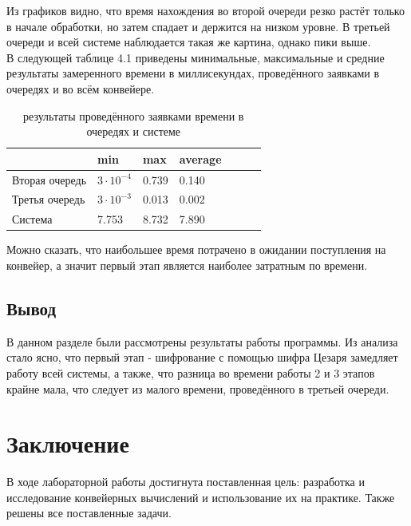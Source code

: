 \documentclass[12pt,a4paper]{report}
\begin{document}
Из графиков видно, что время нахождения во второй очереди резко растёт только в начале обработки, но затем 
спадает и держится на низком уровне.
В третьей очереди и всей системе наблюдается такая же картина, однако пики выше.\\

\newpage
В следующей таблице 4.1 приведены минимальные, максимальные и средние результаты замеренного времени в миллисекундах, 
проведённого заявками в очередях и во всём конвейере.

\begin{table}[h!]
	\caption{результаты проведённого заявками времени в очередях и системе}
	\label{tabular:timesandtenses}
	\begin{center}
		\begin{tabular}{ | l | l | l | l | l | l | l | }
			\hline
			& min               & max   & average \\ \hline
			Вторая очередь & $3 \cdot 10^{-4}$ & 0.739 & 0.140   \\ \hline
			Третья очередь & $3 \cdot 10^{-3}$ & 0.013 & 0.002   \\ \hline
			Система        & 7.753             & 8.732 & 7.890   \\ \hline
		\end{tabular}
	\end{center}
\end{table}

Можно сказать, что наибольшее время потрачено в ожидании поступления на конвейер, а значит первый этап 
является наиболее затратным по времени.

\section*{Вывод}
В данном разделе были рассмотрены результаты работы программы.
Из анализа стало ясно, что первый этап - шифрование с помощью шифра Цезаря замедляет работу всей системы, 
а также, что разница во времени работы 2 и 3 этапов крайне мала, что следует из малого времени, проведённого 
в третьей очереди.

\newpage
\chapter*{Заключение}

В ходе лабораторной работы достигнута поставленная цель: разработка и исследование конвейерных вычислений и 
использование их на практике. 
Также решены все поставленные задачи.
\end{document}
